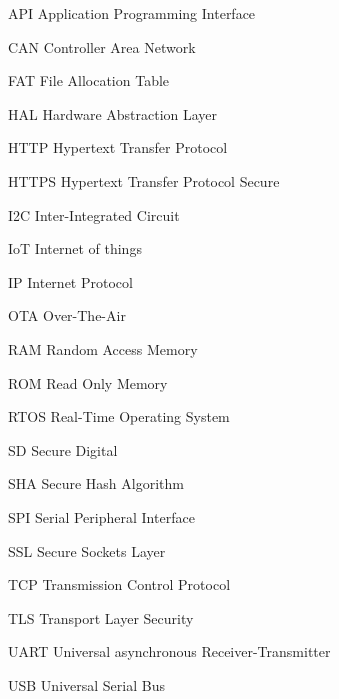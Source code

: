 
\begin{siglas}
    \item[API] Application Programming Interface 
    \item[CAN] Controller Area Network
    \item[FAT]  File Allocation Table
    \item[HAL] Hardware Abstraction Layer
    \item[HTTP] Hypertext Transfer Protocol
    \item[HTTPS]  Hypertext Transfer Protocol Secure
    \item[I2C] Inter-Integrated Circuit
    \item[IoT] Internet of things
    \item[IP] Internet Protocol 
    \item[OTA] Over-The-Air 
    \item[RAM] Random Access Memory  
    \item[ROM] Read Only Memory
    \item[RTOS] Real-Time Operating System
    \item[SD] Secure Digital
    \item[SHA] Secure Hash Algorithm
    \item[SPI] Serial Peripheral Interface
    \item[SSL]  Secure Sockets Layer
    \item[TCP] Transmission Control Protocol 
    \item[TLS] Transport Layer Security
    \item[UART] Universal asynchronous Receiver-Transmitter
    \item[USB] Universal Serial Bus


      
\end{siglas}

